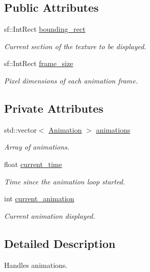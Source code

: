 \subsection*{Public Attributes}
\begin{DoxyCompactItemize}
\item 
sf\+::\+Int\+Rect \hyperlink{class_animation_handler_ae38964052ccbdd44d92c8d23eb0b880d}{bounding\+\_\+rect}
\begin{DoxyCompactList}\small\item\em Current section of the texture to be displayed. \end{DoxyCompactList}\item 
sf\+::\+Int\+Rect \hyperlink{class_animation_handler_a8615fd6169591c5788c9f6a83cdf0ec7}{frame\+\_\+size}
\begin{DoxyCompactList}\small\item\em Pixel dimensions of each animation frame. \end{DoxyCompactList}\end{DoxyCompactItemize}
\subsection*{Private Attributes}
\begin{DoxyCompactItemize}
\item 
std\+::vector$<$ \hyperlink{class_animation}{Animation} $>$ \hyperlink{class_animation_handler_ab04e2b457325095c264dba4a067690cd}{animations}
\begin{DoxyCompactList}\small\item\em Array of animations. \end{DoxyCompactList}\item 
float \hyperlink{class_animation_handler_a91dd0c9aeb1b824a2ddef6b6867a0245}{current\+\_\+time}
\begin{DoxyCompactList}\small\item\em Time since the animation loop started. \end{DoxyCompactList}\item 
int \hyperlink{class_animation_handler_ad03db9fa9c9589a72b438033b283a9cb}{current\+\_\+animation}
\begin{DoxyCompactList}\small\item\em Current animation displayed. \end{DoxyCompactList}\end{DoxyCompactItemize}


\subsection{Detailed Description}
Handles animations. 

